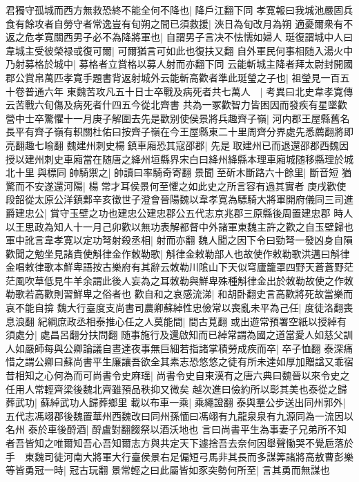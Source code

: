 君獨守孤城而西方無救恐終不能全何不降也|{
	降戶江翻下同}
孝寛報曰我城池嚴固兵食有餘攻者自勞守者常逸豈有旬朔之間已須救援|{
	浹日為旬改月為朔}
適憂爾衆有不返之危孝寛關西男子必不為降將軍也|{
	自謂男子言决不怯懦如婦人}
珽復謂城中人曰韋城主受彼榮禄或復可爾|{
	可爾猶言可如此也復扶又翻}
自外軍民何事相随入湯火中乃射募格於城中|{
	募格者立賞格以募人射而亦翻下同}
云能斬城主降者拜太尉封開國郡公賞帛萬匹孝寛手題書背返射城外云能斬高歡者準此珽瑩之子也|{
	祖瑩見一百五十卷普通六年}
東魏苦攻凡五十日士卒戰及病死者共七萬人　|{
	考異曰北史韋孝寛傳云苦戰六旬傷及病死者什四五今從北齊書}
共為一冢歡智力皆困因而發疾有星墜歡營中士卒驚懼十一月庚子解圍去先是歡别使侯景將兵趣齊子嶺|{
	河内郡王屋縣舊名長平有齊子嶺有軹關杜佑曰按齊子嶺在今王屋縣東二十里周齊分界處先悉薦翻將即亮翻趣七喻翻}
魏建州刺史楊鎮車廂恐其寇邵郡|{
	先是取建州已而退還邵郡西魏因授以建州刺史車廂當在随唐之絳州垣縣界宋白曰絳州絳縣本理車廂城随移縣理於城北十里與標同}
帥騎禦之|{
	帥讀曰率騎奇寄翻}
景聞至斫木斷路六十餘里|{
	斷音短}
猶驚而不安遂還河陽|{
	楊常才耳侯景何至懼之如此史之所言容有過其實者}
庚戌歡使段韶從太原公洋鎮鄴辛亥徵世子澄會晉陽魏以韋孝寛為驃騎大將軍開府儀同三司進爵建忠公|{
	賞守玉壁之功也建忠公建忠郡公五代志京兆郡三原縣後周置建忠郡}
時人以王思政為知人十一月己卯歡以無功表解都督中外諸軍東魏主許之歡之自玉壁歸也軍中訛言韋孝寛以定功弩射殺丞相|{
	射而亦翻}
魏人聞之因下令曰勁弩一發凶身自隕歡聞之勉坐見諸貴使斛律金作敇勒歌|{
	斛律金敕勒部人也故使作敕勒歌洪邁曰斛律金唱敕律歌本鮮卑語按古樂府有其辭云敇勒川隂山下天似穹廬籠罩四野天蒼蒼野茫茫風吹草低見牛羊余謂此後人妄為之耳敇勒與鮮卑殊種斛律金出於敇勒故使之作敇勒歌若高歡則習鮮卑之俗者也}
歡自和之哀感流涕|{
	和胡卧翻史言高歡將死故當樂而哀不能自揜}
魏大行臺度支尚書司農卿蘇綽性忠儉常以喪亂未平為己任|{
	度徒洛翻喪息浪翻}
紀綱庶政丞相泰推心任之人莫能間|{
	間古莧翻}
或出遊常預署空紙以授綽有須處分|{
	處昌呂翻分扶問翻}
随事施行及還啟知而已綽常謂為國之道當愛人如慈父訓人如嚴師每與公卿論議自晝達夜事無巨細若指諸掌積勞成疾而卒|{
	卒子恤翻}
泰深痛惜之謂公卿曰蘇尚書平生廉讓吾欲全其素志恐悠悠之徒有所未達如厚加贈諡又乖宿昔相知之心何為而可尚書令史麻瑶|{
	尚書令史自東漢有之唐六典曰魏晉以來令史之任用人常輕齊梁後魏北齊雖預品秩抑又微矣}
越次進曰儉約所以彰其美也泰從之歸葬武功|{
	蘇綽武功人歸葬鄉里}
載以布車一乘|{
	乘繩證翻}
泰與羣公步送出同州郭外|{
	五代志馮翊郡後魏置華州西魏改曰同州孫愐曰馮翊有九龍泉泉有九源同為一流因以名州}
泰於車後酹酒|{
	酹盧對翻餟祭以酒沃地也}
言曰尚書平生為事妻子兄弟所不知者吾皆知之唯爾知吾心吾知爾志方與共定天下遽捨吾去奈何因舉聲慟哭不覺巵落於手　東魏司徒河南大將軍大行臺侯景右足偏短弓馬非其長而多謀筭諸將高敖曹彭樂等皆勇冠一時|{
	冠古玩翻}
景常輕之曰此屬皆如豕突勢何所至|{
	言其勇而無謀也}
